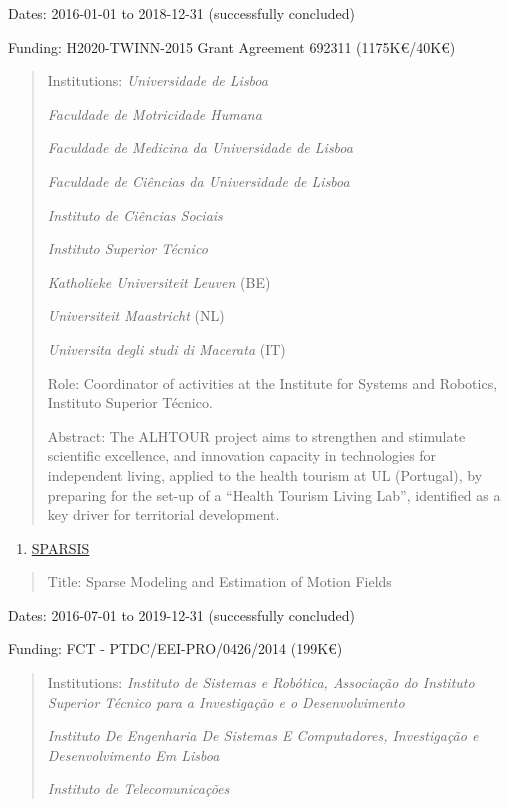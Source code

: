 Dates: 2016-01-01 to 2018-12-31 (successfully concluded)

Funding: H2020-TWINN-2015 Grant Agreement 692311 (1175K€/40K€)

\begin{quote}
Institutions: \emph{Universidade de Lisboa}

\emph{Faculdade de Motricidade Humana}

\emph{Faculdade de Medicina da Universidade de Lisboa}

\emph{Faculdade de Ciências da Universidade de Lisboa}

\emph{Instituto de Ciências Sociais}

\emph{Instituto Superior Técnico}

\emph{Katholieke Universiteit Leuven} (BE)

\emph{Universiteit Maastricht} (NL)

\emph{Universita degli studi di Macerata} (IT)

Role: Coordinator of activities at the Institute for Systems and
Robotics, Instituto Superior Técnico.

Abstract: The ALHTOUR project aims to strengthen and stimulate
scientific excellence, and innovation capacity in technologies for
independent living, applied to the health tourism at UL (Portugal), by
preparing for the set-up of a ``Health Tourism Living Lab'', identified
as a key driver for territorial development.
\end{quote}

\begin{enumerate}
\def\labelenumi{\arabic{enumi}.}
\setcounter{enumi}{6}
\item
  \ul{SPARSIS}
\end{enumerate}

\begin{quote}
Title: Sparse Modeling and Estimation of Motion Fields
\end{quote}

Dates: 2016-07-01 to 2019-12-31 (successfully concluded)

Funding: FCT - PTDC/EEI-PRO/0426/2014 (199K€)

\begin{quote}
Institutions: \emph{Instituto de Sistemas e Robótica, Associação do
Instituto Superior Técnico para a Investigação e o Desenvolvimento}

\emph{Instituto De Engenharia De Sistemas E Computadores, Investigação e
Desenvolvimento Em Lisboa}

\emph{Instituto de Telecomunicações}
\end{quote}

